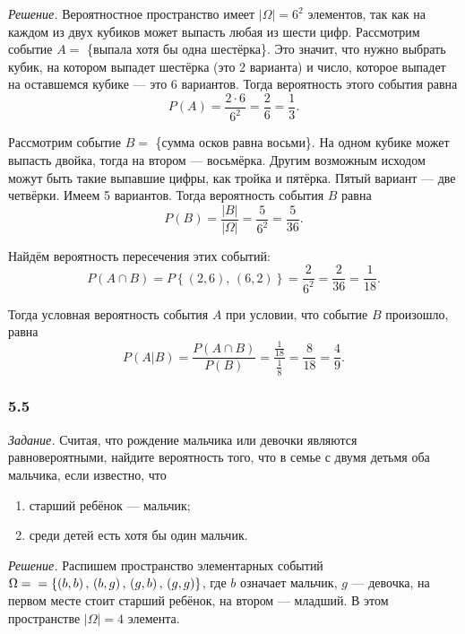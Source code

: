 \textit{Решение.}
Вероятностное пространство имеет $ \left| \Omega \right| = 6^2$ элементов, так как на каждом из двух кубиков может выпасть любая из шести цифр.
Рассмотрим событие $A =$ \{выпала хотя бы одна шестёрка\}.
Это значит, что нужно выбрать кубик, на котором выпадет шестёрка (это 2 варианта) и число, которое выпадет на оставшемся кубике --- это $6$ вариантов.
Тогда вероятность этого события равна
$$P \left( A \right) =
\frac{2 \cdot 6}{6^2} =
\frac{2}{6} =
\frac{1}{3}.$$

Рассмотрим событие $B =$ \{сумма осков равна восьми\}.
На одном кубике может выпасть двойка, тогда на втором --- восьмёрка.
Другим возможным исходом можут быть такие выпавшие цифры, как тройка и пятёрка.
Пятый вариант --- две четвёрки.
Имеем 5 вариантов.
Тогда вероятность события $B$ равна
$$P \left( B \right) =
\frac{ \left| B \right| }{ \left| \Omega \right| } =
\frac{5}{6^2} =
\frac{5}{36}.$$

Найдём вероятность пересечения этих событий:
$$P \left( A \cap B \right) =
P \left\{ \left( 2, 6 \right), \, \left( 6, 2 \right) \right\} =
\frac{2}{6^2} =
\frac{2}{36} =
\frac{1}{18}.$$

Тогда условная вероятность события $A$ при условии, что событие $B$ произошло, равна
$$P \left( \left. A \right| B \right) =
\frac{P \left( A \cap B \right) }{P \left( B \right) } =
\frac{ \frac{1}{18} }{ \frac{1}{8} } =
\frac{8}{18} =
\frac{4}{9}.$$

\subsubsection*{5.5}

\textit{Задание.}
Считая,
что рождение мальчика или девочки являются равновероятными, найдите вероятность того, что в семье с двумя детьмя оба мальчика, если известно, что
\begin{enumerate}[label=\alph*)]
\item старший ребёнок --- мальчик;
\item среди детей есть хотя бы один мальчик.
\end{enumerate}

\textit{Решение.}
Распишем пространство элементарных событий
$ \Omega = \\
= \left\{ \left( b, b \right), \, \left( b, g \right), \, \left( g, b \right), \, \left( g, g \right) \right\} $,
где $b$ означает мальчик, $g$ --- девочка, на первом месте стоит старший ребёнок, на втором --- младший.
В этом пространстве $ \left| \Omega \right| = 4$ элемента.

